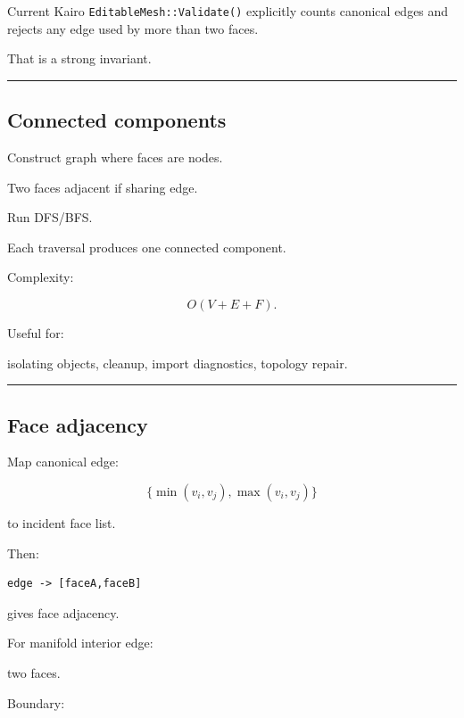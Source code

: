 Current Kairo \texttt{EditableMesh::Validate()} explicitly counts canonical edges and rejects any edge used by more than two faces.

That is a strong invariant.

\begin{center}\rule{0.5\linewidth}{0.5pt}\end{center}

\subsection{Connected components}\label{04-visual-computing-ii-ch041-connected-components}

\hypertarget{04-visual-computing-ii-ch041-connected-components}{}

Construct graph where faces are nodes.

Two faces adjacent if sharing edge.

Run DFS/BFS.

Each traversal produces one connected component.

Complexity:

\[
O(V+E+F).
\]

Useful for:

isolating objects, cleanup, import diagnostics, topology repair.

\begin{center}\rule{0.5\linewidth}{0.5pt}\end{center}

\subsection{Face adjacency}\label{04-visual-computing-ii-ch041-face-adjacency}

\hypertarget{04-visual-computing-ii-ch041-face-adjacency}{}

Map canonical edge:

\[
\{\min(v_i,v_j),\max(v_i,v_j)\}
\]

to incident face list.

Then:

\begin{verbatim}
edge -> [faceA,faceB]
\end{verbatim}

gives face adjacency.

For manifold interior edge:

two faces.

Boundary:

